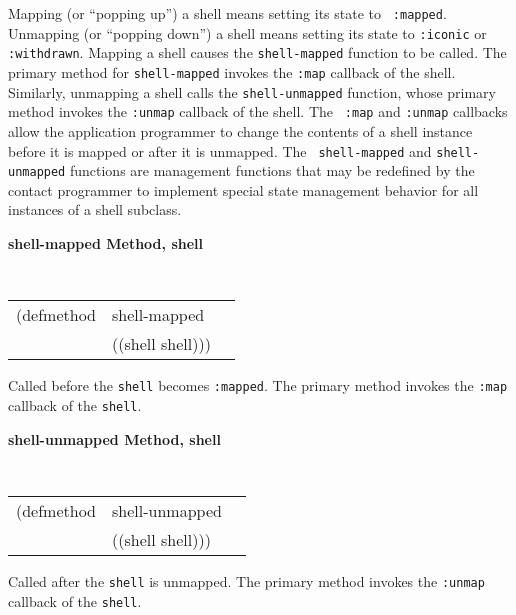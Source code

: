 Mapping (or ``popping up'') a shell means setting its state to {\tt
:mapped}.
Unmapping (or ``popping down'') a shell means setting its state to {\tt :iconic} or {\tt
:withdrawn}.  Mapping a shell causes the {\tt shell-mapped} function to be called.
The primary method for {\tt shell-mapped} invokes the {\tt :map} callback of the
shell.  Similarly, unmapping a shell calls the {\tt shell-unmapped} function,
whose primary method invokes the {\tt :unmap} callback of the shell.  The {\tt
:map} and {\tt :unmap} callbacks allow the application programmer to change the
contents of a shell instance before it is mapped or after it is unmapped. The {\tt
shell-mapped} and {\tt shell-unmapped} functions are management functions that may
be redefined by the contact programmer  to implement special state management
behavior for all instances of a shell subclass.

{\samepage
{\large {\bf shell-mapped \hfill Method, shell}}
\begin{flushright} \parbox[t]{6.125in}{
\tt
\begin{tabular}{lll}
\raggedright
(defmethod & shell-mapped & \\
           & ((shell  shell)))
\end{tabular}
\rm

}\end{flushright}}

\begin{flushright} \parbox[t]{6.125in}{
Called before the {\tt shell} becomes {\tt :mapped}.  The primary method invokes
the {\tt :map} callback of the {\tt shell}.

}\end{flushright}

{\samepage
{\large {\bf shell-unmapped \hfill Method, shell}}
\begin{flushright} \parbox[t]{6.125in}{
\tt
\begin{tabular}{lll}
\raggedright
(defmethod & shell-unmapped & \\
           & ((shell  shell)))
\end{tabular}
\rm

}\end{flushright}}

\begin{flushright} \parbox[t]{6.125in}{
Called after the {\tt shell} is unmapped.  The primary method invokes
the {\tt :unmap} callback of the {\tt shell}.

}\end{flushright}


